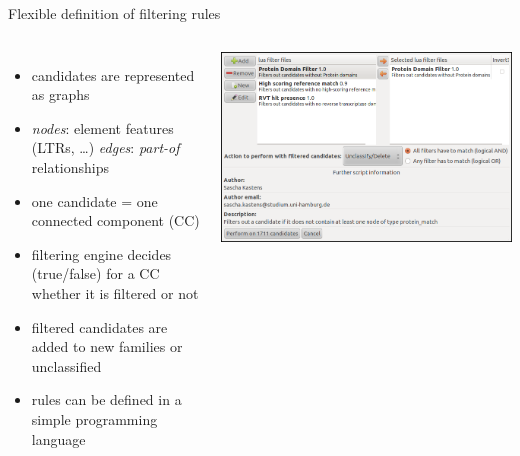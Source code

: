 \documentclass[final]{beamer}
\begin{document}
\begin{frame}[fragile]
\begin{columns}[t]
\begin{column}{.45\linewidth}
      \begin{block}{Flexible definition of filtering rules}
        \begin{columns}
            \begin{itemize}
              \item candidates are represented as graphs
              \item \emph{nodes}: element features (LTRs, \dots)
                    \emph{edges}: \emph{part-of} relationships
              \item one candidate = one connected component (CC)
              \item filtering engine decides (true/false) for a
                    CC whether it is filtered or not
              \item filtered candidates are added to new families or unclassified
              \item rules can be defined in a simple programming language
            \end{itemize}
            \centerline{\includegraphics[width=\textwidth]{Graphics/screenshot_filter}}
          \end{columns}
      \end{block}


\end{column}
\end{columns}
\end{frame}
\end{document}
